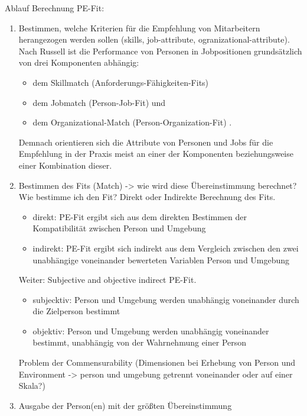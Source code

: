 Ablauf Berechnung PE-Fit: %
\begin{enumerate}
    \item Bestimmen, welche Kriterien für die Empfehlung von Mitarbeitern herangezogen werden sollen (skills, job-attribute, ogranizational-attribute).
Nach Russell ist die Performance von Personen in Jobpositionen grundsätzlich von drei Komponenten abhängig:
\begin{itemize}
    \item dem Skillmatch (Anforderungs-Fähigkeiten-Fits)
    \item dem Jobmatch (Person-Job-Fit) und
    \item dem Organizational-Match (Person-Organization-Fit) \cite{russell:book}.
\end{itemize}
Demnach orientieren sich die Attribute von Personen und Jobs für die Empfehlung in der Praxis meist an einer der Komponenten beziehungsweise einer Kombination dieser.
 \item Bestimmen des Fits (Match) -> wie wird diese Übereinstimmung berechnet?
Wie bestimme ich den Fit? Direkt oder Indirekte Berechnung des Fits. %
\begin{itemize}
    \item direkt: PE-Fit ergibt sich aus dem direkten Bestimmen der Kompatibilität zwischen Person und Umgebung
    \item indirekt: PE-Fit ergibt sich indirekt aus dem Vergleich zwischen den zwei unabhängige voneinander bewerteten Variablen Person und Umgebung
\end{itemize}
Weiter: Subjective and objective indirect PE-Fit.
\begin{itemize}
    \item subjecktiv: Person und Umgebung werden unabhängig voneinander durch die Zielperson bestimmt
    \item objektiv: Person und Umgebung werden unabhängig voneinander bestimmt, unabhängig von der Wahrnehmung einer Person
\end{itemize} %
Problem der Commensurability (Dimensionen bei Erhebung von Person und Environment -> person und umgebung getrennt voneinander oder auf einer Skala?) %

\item Ausgabe der Person(en) mit der größten Übereinstimmung
\end{enumerate}

